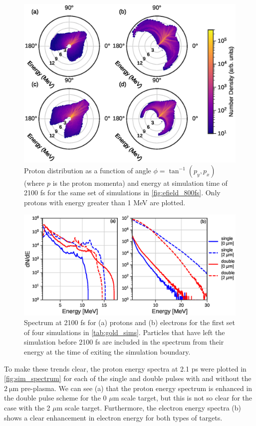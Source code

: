 \begin{figure}
	\centering
	\includegraphics[width=0.9\linewidth]{planning/images/titan/proton_angular_density_2100fs.eps}
	\caption{Proton distribution as a function of angle $\phi = \tan^{-1}(p_y, p_x)$ (where $p$ is the proton momenta) and energy at simulation time of 2100 fs for the same set of simulations in \autoref{fig:efield_800fs}. Only protons with energy greater than 1 MeV are plotted. }
	\label{fig:sim_protons_angular}
\end{figure}

\begin{figure}
	\centering
	\includegraphics[width=0.9\linewidth]{planning/images/titan/spectrum_2100fs.eps}
	\caption{Spectrum at 2100 fs for (a) protons and (b) electrons for the first set of four simulations in \autoref{tab:gold_sims}. Particles that have left the simulation before 2100 fs are included in the spectrum from their energy at the time of exiting the simulation boundary.}
	\label{fig:sim_spectrum}
\end{figure}

To make these trends clear, the proton energy spectra at 2.1 ps were plotted in \autoref{fig:sim_spectrum} for each of the single and double pulses with and without the $\SI{2}{\micro \meter}$ pre-plasma. We can see (a) that the proton energy spectrum is enhanced in the double pulse scheme for the 0 $\mu$m scale target, but this is not so clear for the case with the 2 $\mu$m scale target. Furthermore, the electron energy spectra (b) shows a clear enhancement in electron energy for both types of targets. 

